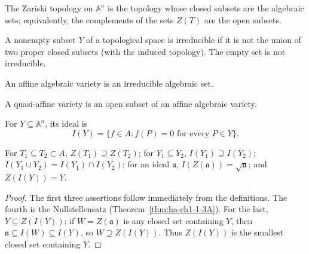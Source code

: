 \begin{definition}
\label{def:ha-ch1-zariski-topology}
The Zariski topology on $\mathbb A^n$ is the topology whose closed subsets are the algebraic
sets; equivalently, the complements of the sets $Z(T)$ are the open subsets.
\end{definition}

\begin{definition}
\label{def:ha-ch1-irreducible-subset}
A nonempty subset $Y$ of a topological space is irreducible if it is not the union of two proper
closed subsets (with the induced topology). The empty set is not irreducible.
\end{definition}

\begin{definition}
\label{def:ha-ch1-affine-variety}
An affine algebraic variety is an irreducible algebraic set.
\end{definition}

\begin{definition}
\label{def:ha-ch1-quasi-affine-variety}
A quasi-affine variety is an open subset of an affine algebraic variety.
\end{definition}

\begin{definition}
\label{def:ha-ch1-vanishing-ideal}
For $Y\subseteq\mathbb A^n$, its ideal is
\[
 I(Y)=\{f\in A:f(P)=0\text{ for every }P\in Y\}.
\]
\end{definition}

\begin{proposition}
\label{prop:ha-ch1-1-2}
For $T_1\subseteq T_2\subset A$, $Z(T_1)\supseteq Z(T_2)$; for $Y_1\subseteq Y_2$,
$I(Y_1)\supseteq I(Y_2)$; $I(Y_1\cup Y_2)=I(Y_1)\cap I(Y_2)$; for an ideal $\mathfrak a$,
$I(Z(\mathfrak a))=\sqrt{\mathfrak a}$; and $Z(I(Y))=\overline Y$.
\end{proposition}
\begin{proof}
The first three assertions follow immediately from the definitions.  The fourth is the
Nullstellensatz (Theorem~\ref{thm:ha-ch1-1-3A}).  For the last, $Y\subseteq Z(I(Y))$; if
$W=Z(\mathfrak a)$ is any closed set containing $Y$, then $\mathfrak a\subseteq I(W)\subseteq I(Y)$,
so $W\supseteq Z(I(Y))$.  Thus $Z(I(Y))$ is the smallest closed set containing $Y$.
\end{proof}

